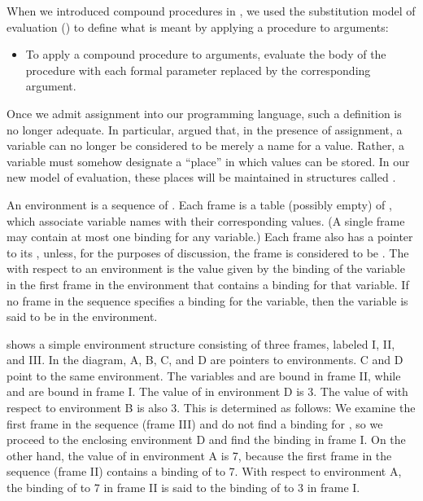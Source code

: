 When we introduced compound procedures in , we used the
substitution model of evaluation () to define what is meant
by applying a procedure to arguments:

\begin{itemize}
\item
To apply a compound procedure to arguments, evaluate the body of the procedure
with each formal parameter replaced by the corresponding argument.
\end{itemize}

\noindent
Once we admit assignment into our programming language, such a definition is no
longer adequate.  In particular,  argued that, in the
presence of assignment, a variable can no longer be considered to be merely a
name for a value.  Rather, a variable must somehow designate a ``place'' in
which values can be stored.  In our new model of evaluation, these places will
be maintained in structures called .

An environment is a sequence of .  Each frame is a table
(possibly empty) of , which associate variable names with
their corresponding values.  (A single frame may contain at most one binding
for any variable.)  Each frame also has a pointer to its , unless, for the purposes of discussion, the frame is considered
to be .  The  with respect to an
environment is the value given by the binding of the variable in the first
frame in the environment that contains a binding for that variable.  If no
frame in the sequence specifies a binding for the variable, then the variable
is said to be  in the environment.

 shows a simple environment structure consisting of three
frames, labeled I, II, and III.  In the diagram, A, B, C, and D are pointers to
environments.  C and D point to the same environment.  The variables 
and  are bound in frame II, while  and  are bound in
frame I.  The value of  in environment D is 3.  The value of 
with respect to environment B is also 3.  This is determined as follows: We
examine the first frame in the sequence (frame III) and do not find a binding
for , so we proceed to the enclosing environment D and find the binding
in frame I.  On the other hand, the value of  in environment A is 7,
because the first frame in the sequence (frame II) contains a binding of
 to 7.  With respect to environment A, the binding of  to 7 in
frame II is said to  the binding of  to 3 in frame I.

